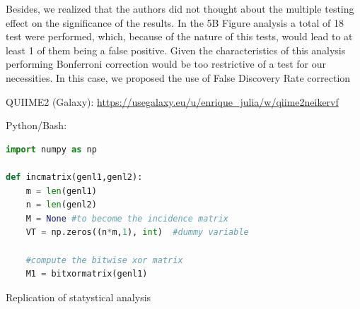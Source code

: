 \documentclass{article}
\begin{document}
Besides, we realized that the authors did not thought about the multiple testing effect on the significance of the results. In the 5B Figure analysis a total of 18 test were performed, which, because of the nature of this tests, would lead to at least 1 of them being a false positive. Given the characteristics of this analysis performing Bonferroni correction would be too restrictive of a test for our necessities. In this case, we proposed the use of False Discovery Rate correction

QUIIME2 (Galaxy): \url{https://usegalaxy.eu/u/enrique_julia/w/qiime2neikervf}


Python/Bash:

\begin{lstlisting}[language=Python, caption=Python example]
import numpy as np
    
def incmatrix(genl1,genl2):
    m = len(genl1)
    n = len(genl2)
    M = None #to become the incidence matrix
    VT = np.zeros((n*m,1), int)  #dummy variable
    
    #compute the bitwise xor matrix
    M1 = bitxormatrix(genl1)
\end{lstlisting}

Replication of statystical analysis
\end{document}
